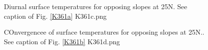 \begin{figure}[!ht] 
\caption[Valley temperatures 25N]{Diurnal surface temperatures for opposing slopes at 25N. See caption of Fig.  \ref{K361a}
\label{K361c}  K361c.png  }
\end{figure} 

\begin{figure}[!ht] 
\caption[Valley convergence 25N]{COnvergencee of surface temperatures for opposing slopes at 25N.. See caption of Fig.  \ref{K361b}
\label{K361d}  K361d.png  }
\end{figure} 
